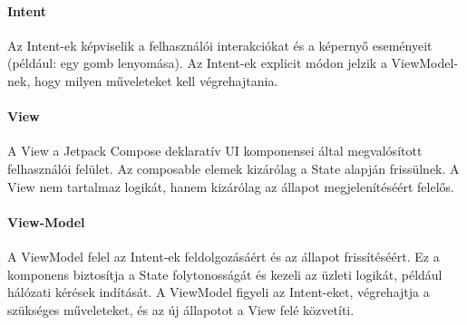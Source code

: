 \paragraph{Intent}
Az Intent-ek képviselik a felhasználói interakciókat és a képernyő eseményeit (például: egy gomb lenyomása). 
Az Intent-ek explicit módon jelzik a ViewModel-nek, hogy milyen műveleteket kell végrehajtania.

\paragraph{View}
A View a Jetpack Compose deklaratív UI komponensei által megvalósított felhasználói felület.
Az composable elemek kizárólag a State alapján frissülnek.
A View nem tartalmaz logikát, hanem kizárólag az állapot megjelenítéséért felelős.


\paragraph{View-Model}
A ViewModel felel az Intent-ek feldolgozásáért és az állapot frissítéséért. 
Ez a komponens biztosítja a State folytonosságát és kezeli az üzleti logikát,
például hálózati kérések indítását.
A ViewModel figyeli az Intent-eket, végrehajtja a szükséges műveleteket, és az új állapotot a View felé közvetíti.


